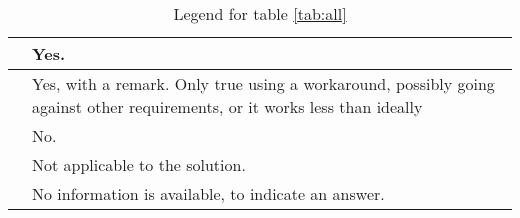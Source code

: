 \newcommand{\rot}[1]{\rotatebox[origin=l]{90}{\textbf{#1}}}%
\newcommand{\xmark}{\ding{55}}%
\newcommand{\cmark}{\ding{51}}%


\begin{table}
	\begin{tabular}{ | c | p{300px} | }
		\hline
		\green{\cmark} 		& Yes. 																														\\
		\hline
		\yellow{\cmark} 	& Yes, with a remark. Only true using a workaround, possibly going against other requirements, or it works less than ideally\\
		\hline
		\red{\xmark} 		& No. 																														\\
		\hline
		\grey{} 			& Not applicable to the solution. 																							\\
		\hline
		\white{} 			& No information is available, to indicate an answer. 																		\\
		\hline
	\end{tabular}

	\caption{Legend for table \ref{tab:all}}
	\label{tbl:all_legend}
\end{table}




